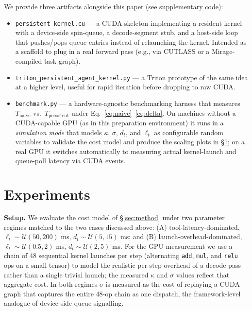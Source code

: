 \documentclass{article}
\begin{document}
We provide three artifacts alongside this paper (see supplementary
code):

\begin{itemize}
  \item \texttt{persistent\_kernel.cu} --- a CUDA skeleton implementing
  a resident kernel with a device-side spin-queue, a decode-segment
  stub, and a host-side loop that pushes/pops queue entries instead of
  relaunching the kernel. Intended as a scaffold to plug in a real
  forward pass (e.g., via CUTLASS or a Mirage-compiled task graph).
  \item \texttt{triton\_persistent\_agent\_kernel.py} --- a Triton
  prototype of the same idea at a higher level, useful for rapid
  iteration before dropping to raw CUDA.
  \item \texttt{benchmark.py} --- a hardware-agnostic benchmarking
  harness that measures $T_{\text{naive}}$ vs.\ $T_{\text{persistent}}$
  under Eq.~\ref{eq:naive}--\ref{eq:delta}. On machines without a
  CUDA-capable GPU (as in this preparation environment) it runs in a
  \emph{simulation mode} that models $\kappa$, $\sigma$, $d_t$, and
  $\ell_t$ as configurable random variables to validate the cost model
  and produce the scaling plots in \S\ref{sec:experiments}; on a real
  GPU it switches automatically to measuring actual kernel-launch and
  queue-poll latency via CUDA events.
\end{itemize}

\section{Experiments}
\label{sec:experiments}

\textbf{Setup.} We evaluate the cost model of \S\ref{sec:method}
under two parameter regimes matched to the two cases discussed above:
(A) tool-latency-dominated, $\ell_t \sim \mathcal{U}(50,200)$ ms,
$d_t \sim \mathcal{U}(5,15)$ ms; and (B)
launch-overhead-dominated, $\ell_t \sim \mathcal{U}(0.5,2)$ ms,
$d_t \sim \mathcal{U}(2,5)$ ms.
For the GPU measurement we use a chain of 48 sequential kernel
launches per step (alternating \texttt{add}, \texttt{mul}, and
\texttt{relu} ops on a small tensor) to model the realistic per-step
overhead of a decode pass rather than a single trivial launch;
the measured $\kappa$ and $\sigma$ values reflect that aggregate
cost. In both regimes $\sigma$ is measured as the cost of replaying
a CUDA graph that captures the entire 48-op chain as one dispatch,
the framework-level analogue of device-side queue signalling.
\end{document}
